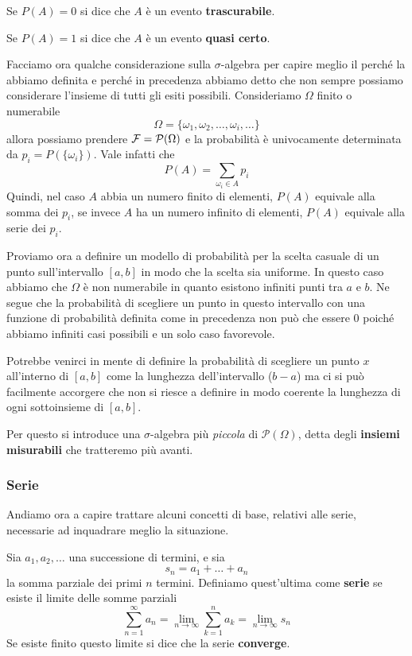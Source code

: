 \begin{definition}
	Se $P(A) = 0$ si dice che $A$ è un evento \textbf{trascurabile}.
\end{definition}

\begin{definition}
	Se $P(A) = 1$ si dice che $A$ è un evento \textbf{quasi certo}.
\end{definition}

Facciamo ora qualche considerazione sulla $\sigma$-algebra per capire meglio il perché la abbiamo
definita e perché in precedenza abbiamo detto che non sempre possiamo considerare l'insieme di
tutti gli esiti possibili. Consideriamo $\Omega$ finito o numerabile
\[ \Omega = \{ \omega_1, \omega_2, \dots, \omega_i, \dots \} \]
allora possiamo prendere $\mathcal{F} = \mathcal{P}(\Omega)$ e la probabilità è univocamente determinata
da $p_i = P(\{ \omega_i \})$. Vale infatti che
\[ P(A) = \sum_{\omega_i \in A} p_i \]
Quindi, nel caso $A$ abbia un numero finito di elementi, $P(A)$ equivale alla somma dei $p_i$, se
invece $A$ ha un numero infinito di elementi, $P(A)$ equivale alla serie dei $p_i$.

Proviamo ora a definire un modello di probabilità per la scelta casuale di un punto sull'intervallo
$[a,b]$ in modo che la scelta sia uniforme. In questo caso abbiamo che $\Omega$ è non
numerabile in quanto esistono infiniti punti tra $a$ e $b$. Ne segue che la probabilità di
scegliere un punto in questo intervallo con una funzione di probabilità definita come in
precedenza non può che essere 0 poiché abbiamo infiniti casi possibili e un solo caso favorevole.

Potrebbe venirci in mente di definire la probabilità di scegliere un punto $x$ all'interno di
$[a,b]$ come la lunghezza dell'intervallo ($b-a$) ma ci si può facilmente accorgere che non
si riesce a definire in modo coerente la lunghezza di ogni sottoinsieme di $[a,b]$.

Per questo si introduce una $\sigma$-algebra più \emph{piccola} di $\mathcal{P}(\Omega)$,
detta degli \textbf{insiemi misurabili} che tratteremo più avanti.

\subsubsection{Serie}
Andiamo ora a capire trattare alcuni concetti di base, relativi alle serie, necessarie ad
inquadrare meglio la situazione.

\begin{definition}
	Sia $a_1, a_2, \dots$ una successione di termini, e sia
	\[ s_n = a_1 + \dots + a_n \]
	la somma parziale dei primi $n$ termini. Definiamo quest'ultima come \textbf{serie} se esiste
	il limite delle somme parziali
	\[ \sum_{n=1}^\infty a_n = \lim_{n \to \infty} \sum_{k=1}^n a_k = \lim_{n \to \infty} s_n \]
	Se esiste finito questo limite si dice che la serie \textbf{converge}.
\end{definition}

